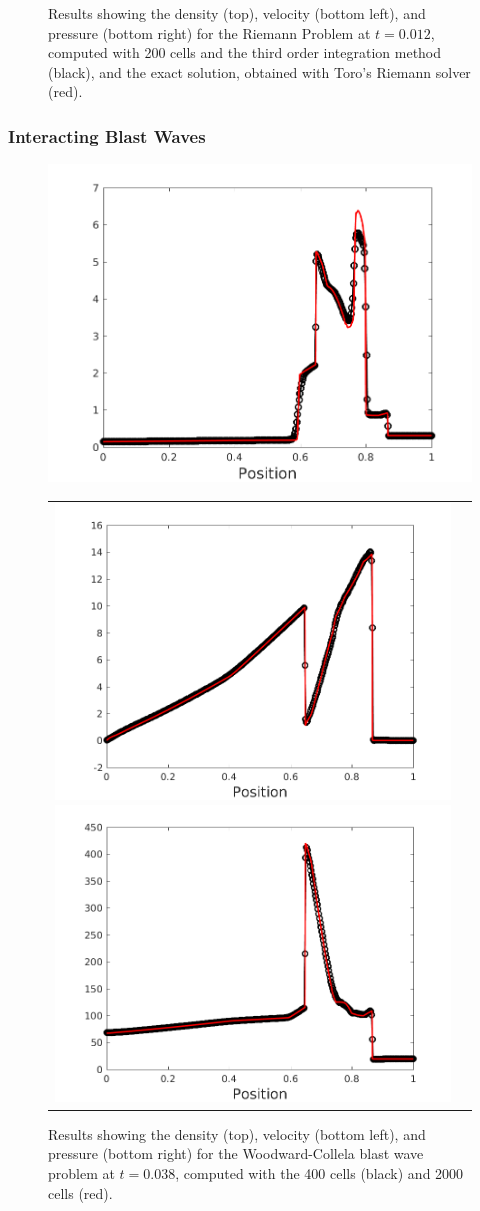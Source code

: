 \documentclass[10pt,preprint]{aastex}
\begin{document}
\begin{figure}[h]
\begin{center}
\begin{tabular}{cc}
	\end{tabular}	
  \end{center}
  \caption{Results showing the density (top), velocity (bottom left), and pressure (bottom right) for the Riemann Problem at $t=0.012$, computed with 200 cells and the third order integration method (black), and the exact solution, obtained with Toro's Riemann solver (red).}
  \label{fig:Riemann}
\end{figure}

\subsubsection{Interacting Blast Waves}

\begin{figure}[h]
  \begin{center}
     \includegraphics[width=.95\textwidth]{BlastD.png}	
	\begin{tabular}{cc}
     \includegraphics[width=.475\textwidth]{BlastV.png}
     \includegraphics[width=.475\textwidth]{BlastP.png}	
    \end{tabular}
  \end{center}
  \caption{Results showing the density (top), velocity (bottom left), and pressure (bottom right) for the Woodward-Collela blast wave problem at $t=0.038$, computed with the 400 cells (black) and 2000 cells (red).}
  \label{fig:Blast}
\end{figure}
\end{document}
